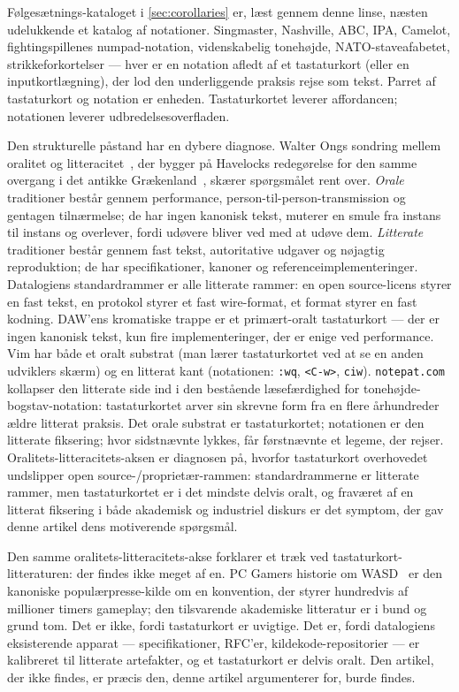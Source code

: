 \documentclass[10pt,letterpaper,twocolumn]{article}
\begin{document}
Følgesætnings-kataloget i \textsection\ref{sec:corollaries} er, læst gennem denne linse, næsten udelukkende et katalog af notationer. Singmaster, Nashville, ABC, IPA, Camelot, fightingspillenes numpad-notation, videnskabelig tonehøjde, NATO-staveafabetet, strikkeforkortelser --- hver er en notation afledt af et tastaturkort (eller en inputkortlægning), der lod den underliggende praksis rejse som tekst. Parret af tastaturkort og notation er enheden. Tastaturkortet leverer affordancen; notationen leverer udbredelsesoverfladen.

Den strukturelle påstand har en dybere diagnose. Walter Ongs sondring mellem oralitet og litteracitet~\citep{ong1982orality}, der bygger på Havelocks redegørelse for den samme overgang i det antikke Grækenland~\citep{havelock1963preface}, skærer spørgsmålet rent over. \emph{Orale} traditioner består gennem performance, person-til-person-transmission og gentagen tilnærmelse; de har ingen kanonisk tekst, muterer en smule fra instans til instans og overlever, fordi udøvere bliver ved med at udøve dem. \emph{Litterate} traditioner består gennem fast tekst, autoritative udgaver og nøjagtig reproduktion; de har specifikationer, kanoner og referenceimplementeringer. Datalogiens standardrammer er alle litterate rammer: en open source-licens styrer en fast tekst, en protokol styrer et fast wire-format, et format styrer en fast kodning. DAW'ens kromatiske trappe er et primært-oralt tastaturkort --- der er ingen kanonisk tekst, kun fire implementeringer, der er enige ved performance. Vim har både et oralt substrat (man lærer tastaturkortet ved at se en anden udviklers skærm) og en litterat kant (notationen: \texttt{:wq}, \texttt{<C-w>}, \texttt{ciw}). \texttt{notepat.com} kollapser den litterate side ind i den bestående læsefærdighed for tonehøjde-bogstav-notation: tastaturkortet arver sin skrevne form fra en flere århundreder ældre litterat praksis. Det orale substrat er tastaturkortet; notationen er den litterate fiksering; hvor sidstnævnte lykkes, får førstnævnte et legeme, der rejser. Oralitets-litteracitets-aksen er diagnosen på, hvorfor tastaturkort overhovedet undslipper open source-/proprietær-rammen: standardrammerne er litterate rammer, men tastaturkortet er i det mindste delvis oralt, og fraværet af en litterat fiksering i både akademisk og industriel diskurs er det symptom, der gav denne artikel dens motiverende spørgsmål.

Den samme oralitets-litteracitets-akse forklarer et træk ved tastaturkort-litteraturen: der findes ikke meget af en. PC Gamers historie om WASD~\citep{fenlon2016wasd} er den kanoniske populærpresse-kilde om en konvention, der styrer hundredvis af millioner timers gameplay; den tilsvarende akademiske litteratur er i bund og grund tom. Det er ikke, fordi tastaturkort er uvigtige. Det er, fordi datalogiens eksisterende apparat --- specifikationer, RFC'er, kildekode-repositorier --- er kalibreret til litterate artefakter, og et tastaturkort er delvis oralt. Den artikel, der ikke findes, er præcis den, denne artikel argumenterer for, burde findes.
\end{document}
